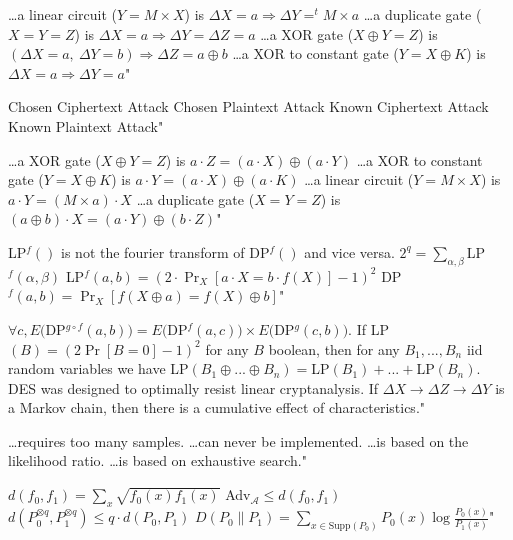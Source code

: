{\ldots a linear circuit ($Y=M\times X$) is $\Delta X=a\Rightarrow \Delta Y=^tM\times a$}
{\ldots a duplicate gate ($X=Y=Z$) is $\Delta X=a\Rightarrow \Delta Y = \Delta Z = a$}
{\ldots a XOR gate ($X\oplus Y = Z$) is $(\Delta X=a,\ \Delta Y=b)\Rightarrow \Delta Z = a\oplus b$}
{\ldots a XOR to constant gate ($Y=X\oplus K$) is $\Delta X = a \Rightarrow \Delta Y = a$"}

{Chosen Ciphertext Attack}
{Chosen Plaintext Attack}
{Known Ciphertext Attack}
{Known Plaintext Attack"}

{\ldots a XOR gate ($X\oplus Y = Z$) is $a\cdot Z=(a\cdot X)\oplus (a\cdot Y)$}
{\ldots a XOR to constant gate ($Y=X\oplus K$) is $a\cdot Y = (a\cdot X)\oplus (a\cdot K)$}
{\ldots a linear circuit ($Y=M\times X$) is $a\cdot Y = (M\times a)\cdot X$}
{\ldots a duplicate gate ($X=Y=Z$) is $(a\oplus b)\cdot X=(a\cdot Y)\oplus (b\cdot Z)$"}

{LP$^f()$ is not the fourier transform of DP$^f()$ and vice versa.}
{$2^q=\displaystyle\sum_{\alpha ,\beta}$LP$^f(\alpha ,\beta)$}
{LP$^f(a,b)=(2\cdot\displaystyle\Pr_{X}[a\cdot X=b\cdot f(X)]-1)^2$}
{DP$^f(a,b)=\displaystyle\Pr_{X}[f(X\oplus a)=f(X)\oplus b]$"}

{$\forall c, E($DP$^{g\circ f}(a,b))=E($DP$^f(a,c))\times E($DP$^g(c,b))$.}
{If LP$(B)=(2\Pr[B=0]-1)^2$ for any $B$ boolean, then for any $B_1,...,B_n$ iid random variables we have LP$(B_1\oplus ...\oplus B_n)=$LP$(B_1)+...+$LP$(B_n)$.}
{DES was designed to optimally resist linear cryptanalysis.}
{If $\Delta X \rightarrow \Delta Z \rightarrow \Delta Y$ is a Markov chain, then there is a cumulative effect of characteristics."}

{\ldots requires too many samples.}
{\ldots can never be implemented.}
{\ldots is based on the likelihood ratio.}
{\ldots is based on exhaustive search."}

{$d(f_0,f_1)=\displaystyle\sum_{x}\sqrt{f_0(x)f_1(x)}$}
{Adv$_\mathcal{A} \leq d(f_0,f_1)$}
{$d(P_0^{\otimes q},P_1^{\otimes q}) \leq q \cdot d(P_0,P_1)$}
{$D(P_0\| P_1)=\displaystyle\sum_{x\in \mbox{Supp}(P_0)}P_0(x)\log{\frac{P_0(x)}{P_1(x)}}$"}

